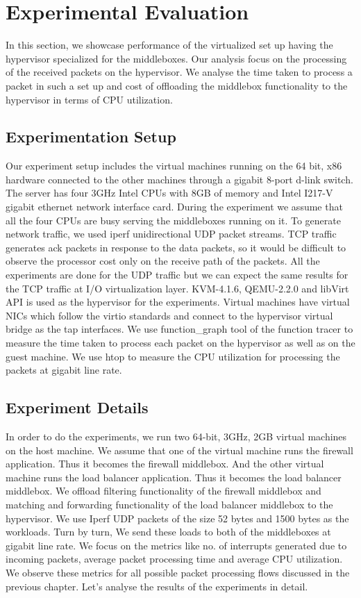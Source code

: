 \documentclass[a4paper,11pt]{report}
\begin{document}
\chapter{Experimental Evaluation}
In this section, we showcase performance of the virtualized set up having the hypervisor specialized for the middleboxes. Our analysis focus on the processing of the received packets on the hypervisor. We analyse the time taken to process a packet in such a set up and cost of offloading the middlebox functionality to the hypervisor in terms of CPU utilization. 

\section{Experimentation Setup}
Our experiment setup includes the virtual machines running on the 64 bit, x86 hardware connected to the other machines through a gigabit 8-port d-link switch. The server has four 3GHz Intel CPUs with 8GB of memory and Intel I217-V gigabit ethernet network interface card. During the experiment we assume that all the four CPUs are busy serving the middleboxes running on it. To generate network traffic, we used iperf\cite{IP} unidirectional UDP packet streams. TCP traffic generates ack packets in response to the data packets, so it would be difficult to observe the processor cost only on the receive path of the packets. All the experiments are done for the UDP traffic but we can expect the same results for the TCP traffic at I/O virtualization layer. KVM-4.1.6, QEMU-2.2.0 and libVirt API is used as the hypervisor for the experiments. Virtual machines have virtual NICs which follow the virtio standards and connect to the hypervisor virtual bridge as the tap interfaces. We use function\_graph tool of the function tracer\cite{FT} to measure the time taken to process each packet on the hypervisor as well as on the guest machine. We use htop\cite{HT} to measure the CPU utilization for processing the packets at gigabit line rate.  

\section{Experiment Details} 
In order to do the experiments, we run two 64-bit, 3GHz, 2GB virtual machines on the host machine. We assume that one of the virtual machine runs the firewall application. Thus it becomes the firewall middlebox. And the other virtual machine runs the load balancer application. Thus it becomes the load balancer middlebox. We offload filtering functionality of the firewall middlebox and matching and forwarding functionality of the load balancer middlebox to the hypervisor. We use Iperf UDP packets of the size 52 bytes and 1500 bytes as the workloads. Turn by turn, We send these loads to both of the middleboxes at gigabit line rate. We focus on the metrics like no. of interrupts generated due to incoming packets, average packet processing time and average CPU utilization. We observe these metrics for all possible packet processing flows discussed in the previous chapter. Let's analyse the results of the experiments in detail.                   	   	
\end{document}
